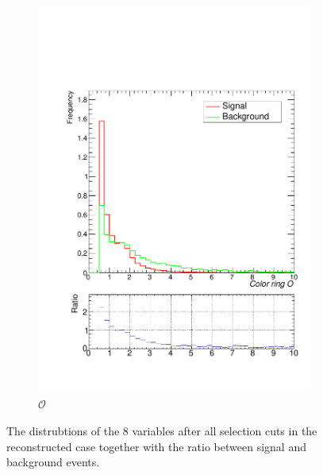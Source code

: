 \documentclass[10pt,a4paper]{book}
\begin{document}
\begin{figure}
\begin{subfigure}{.5\textwidth}
\includegraphics[scale=0.25]{reco/cr}
\caption{$\mathcal{O}$}
\end{subfigure}
\caption{The distrubtions of the 8 variables after all selection cuts in the reconstructed case together with the ratio between signal and background events.}
\label{sgn/bkg reco}
\end{figure}
\end{document}
